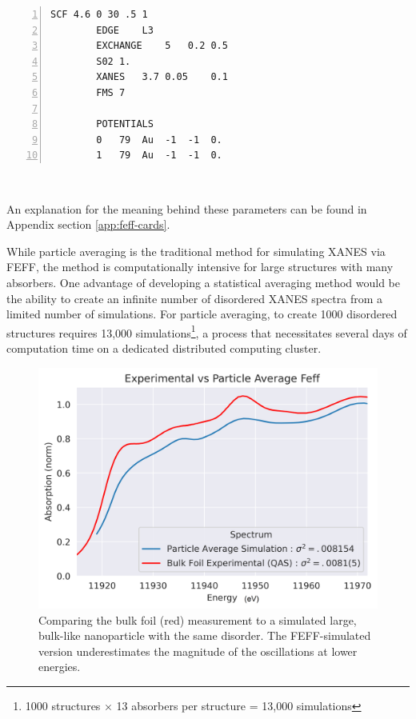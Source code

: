 \vspace{2em}
\begin{minipage}{\linewidth}
	\begin{Verbatim}[samepage=true, numbers=left]
		SCF 4.6 0 30 .5 1
		EDGE    L3
		EXCHANGE    5   0.2 0.5
		S02 1.
		XANES   3.7 0.05    0.1
		FMS 7
	
		POTENTIALS
		0	79	Au	-1	-1	0.
		1	79	Au	-1	-1	0.
	\end{Verbatim}
	~
	\end{minipage}
\noindent An explanation for the meaning behind these parameters can be found in Appendix section \ref{app:feff-cards}.

While particle averaging is the traditional method for simulating XANES via FEFF, the method is computationally intensive for large structures with many absorbers. One advantage of developing a statistical averaging method would be the ability to create an infinite number of disordered XANES spectra from a limited number of simulations. For particle averaging, to create 1000 disordered structures requires 13,000 simulations\footnote{1000 structures $ \times $ 13 absorbers per structure = 13,000 simulations}, a process that necessitates several days of computation time on a dedicated distributed computing cluster.



\begin{figure}[h!]
	\centering
	\includegraphics[width=.7\linewidth]{Chapters/Figures/Bulk_experimental_vs_pa_comparison.png}
	\caption[Simulation vs. Experimental 3]{Comparing the bulk foil (red) measurement to a simulated large, bulk-like nanoparticle with the same disorder. The FEFF-simulated version underestimates the magnitude of the oscillations at lower energies.}
	\label{fig:avg-experimental-vs-simulation2}
\end{figure}

